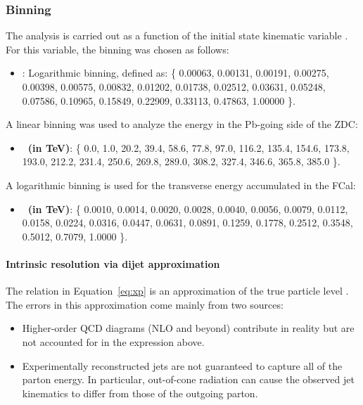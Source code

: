 \subsubsection{Binning}
The analysis is carried out as a function of the initial state kinematic variable \xp.   For this variable, the binning was chosen as follows:
\begin{itemize}
    \item \textbf{\xp}: Logarithmic binning, defined as: \{ 0.00063, 0.00131, 0.00191, 0.00275, 0.00398, 0.00575, 0.00832, 0.01202, 0.01738, 0.02512, 0.03631, 0.05248, 0.07586, 0.10965, 0.15849, 0.22909, 0.33113, 0.47863, 1.00000 \}.
\end{itemize}
A linear binning was used to analyze the energy in the Pb-going side of the ZDC:
\begin{itemize}
    \item \textbf{\EZDC\ (in TeV)}: \{ 0.0, 1.0, 20.2, 39.4, 58.6, 77.8, 97.0, 116.2, 135.4, 154.6, 173.8, 193.0, 212.2, 231.4, 250.6, 269.8, 289.0, 308.2, 327.4, 346.6, 365.8, 385.0 \}.
\end{itemize}
A logarithmic binning is used for the transverse energy accumulated in the FCal:
\begin{itemize}
    \item \textbf{\ETPB\ (in TeV)}: \{ 0.0010, 0.0014, 0.0020, 0.0028, 0.0040, 0.0056, 0.0079, 0.0112, 0.0158, 0.0224, 0.0316, 0.0447, 0.0631, 0.0891, 0.1259, 0.1778, 0.2512, 0.3548, 0.5012, 0.7079, 1.0000 \}.
\end{itemize}

\paragraph{Intrinsic \texorpdfstring{\xp}{xp} resolution via dijet approximation}
The relation in Equation~\ref{eq:xp} is an approximation of the true particle level \xp.
The errors in this approximation come mainly from two sources:
\begin{itemize}
    \item Higher-order QCD diagrams (NLO and beyond) contribute in reality but are not accounted for in the expression above.
    \item Experimentally reconstructed jets are not guaranteed to capture all of the parton energy. In particular, out-of-cone radiation can cause the observed jet kinematics to differ from those of the outgoing parton.
\end{itemize}

